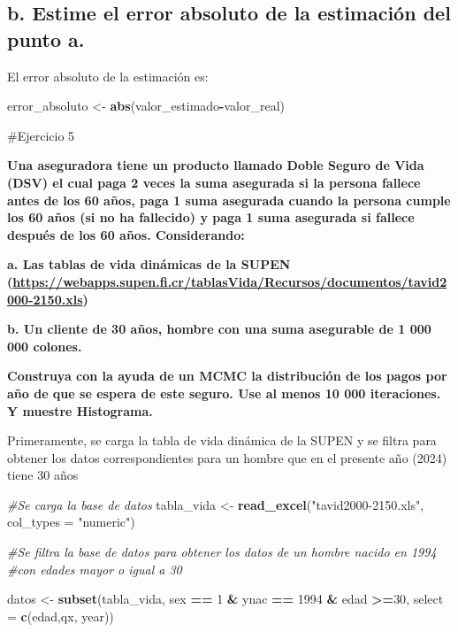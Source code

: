 \documentclass[
]{article}
\newenvironment{Shaded}{\begin{snugshade}}{\end{snugshade}}
\newcommand{\AttributeTok}[1]{\textcolor[rgb]{0.13,0.29,0.53}{#1}}
\newcommand{\CommentTok}[1]{\textcolor[rgb]{0.56,0.35,0.01}{\textit{#1}}}
\newcommand{\DecValTok}[1]{\textcolor[rgb]{0.00,0.00,0.81}{#1}}
\newcommand{\FunctionTok}[1]{\textcolor[rgb]{0.13,0.29,0.53}{\textbf{#1}}}
\newcommand{\NormalTok}[1]{#1}
\newcommand{\OtherTok}[1]{\textcolor[rgb]{0.56,0.35,0.01}{#1}}
\newcommand{\SpecialCharTok}[1]{\textcolor[rgb]{0.81,0.36,0.00}{\textbf{#1}}}
\newcommand{\StringTok}[1]{\textcolor[rgb]{0.31,0.60,0.02}{#1}}
\begin{document}
\hypertarget{b.-estime-el-error-absoluto-de-la-estimaciuxf3n-del-punto-a.}{%
\subsection{b. Estime el error absoluto de la estimación del punto
a.}\label{b.-estime-el-error-absoluto-de-la-estimaciuxf3n-del-punto-a.}}

El error absoluto de la estimación es:

\begin{Shaded}
\begin{Highlighting}[]
\NormalTok{error\_absoluto }\OtherTok{\textless{}{-}} \FunctionTok{abs}\NormalTok{(valor\_estimado}\SpecialCharTok{{-}}\NormalTok{valor\_real)}
\end{Highlighting}
\end{Shaded}

\#Ejercicio 5

\textbf{Una aseguradora tiene un producto llamado Doble Seguro de Vida
(DSV) el cual paga 2 veces la suma asegurada si la persona fallece antes
de los 60 años, paga 1 suma asegurada cuando la persona cumple los 60
años (si no ha fallecido) y paga 1 suma asegurada si fallece después de
los 60 años. Considerando:}

\textbf{a. Las tablas de vida dinámicas de la SUPEN
(\url{https://webapps.supen.fi.cr/tablasVida/Recursos/documentos/tavid2000-2150.xls})}

\textbf{b. Un cliente de 30 años, hombre con una suma asegurable de 1
000 000 colones.}

\textbf{Construya con la ayuda de un MCMC la distribución de los pagos
por año de que se espera de este seguro. Use al menos 10 000
iteraciones. Y muestre Histograma.}

Primeramente, se carga la tabla de vida dinámica de la SUPEN y se filtra
para obtener los datos correspondientes para un hombre que en el
presente año (2024) tiene 30 años

\begin{Shaded}
\begin{Highlighting}[]
\CommentTok{\#Se carga la base de datos}
\NormalTok{tabla\_vida }\OtherTok{\textless{}{-}} \FunctionTok{read\_excel}\NormalTok{(}\StringTok{"tavid2000{-}2150.xls"}\NormalTok{,}
                         \AttributeTok{col\_types =} \StringTok{"numeric"}\NormalTok{)}

\CommentTok{\#Se filtra la base de datos para obtener los datos de un hombre nacido en 1994 }
\CommentTok{\#con edades mayor o igual a 30}

\NormalTok{datos }\OtherTok{\textless{}{-}} \FunctionTok{subset}\NormalTok{(tabla\_vida, sex }\SpecialCharTok{==} \DecValTok{1} \SpecialCharTok{\&}\NormalTok{ ynac }\SpecialCharTok{==} \DecValTok{1994} \SpecialCharTok{\&}\NormalTok{ edad }\SpecialCharTok{\textgreater{}=}\DecValTok{30}\NormalTok{, }\AttributeTok{select =} \FunctionTok{c}\NormalTok{(edad,qx, year))}
\end{Highlighting}
\end{Shaded}
\end{document}
